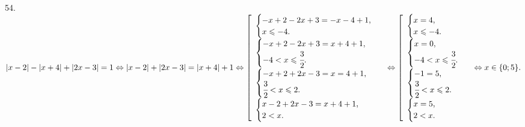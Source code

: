54. $|x-2|-|x+4|+|2x-3|=1\Leftrightarrow|x-2|+|2x-3|=|x+4|+1\Leftrightarrow \left[\begin{array}{l}\begin{cases} -x+2-2x+3=-x-4+1,\\ x\leqslant-4.\end{cases}\\
\begin{cases} -x+2-2x+3=x+4+1,\\ -4<x\leqslant\cfrac{3}{2}.\end{cases}\\ \begin{cases} -x+2+2x-3=x=4+1,\\ \cfrac{3}{2}<x\leqslant2.\end{cases}\\
\begin{cases} x-2+2x-3=x+4+1,\\ 2<x.\end{cases}\end{array}\right.\Leftrightarrow \left[\begin{array}{l}\begin{cases} x=4,\\ x\leqslant-4.\end{cases}\\
\begin{cases} x=0,\\ -4<x\leqslant\cfrac{3}{2}.\end{cases}\\ \begin{cases} -1=5,\\ \cfrac{3}{2}<x\leqslant2.\end{cases}\\
\begin{cases} x=5,\\ 2< x.\end{cases}\end{array}\right.\Leftrightarrow x\in\{0; 5\}.$\\
